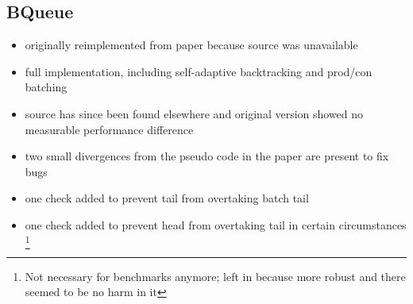 \subsection{BQueue}
\begin{itemize}
    \item originally reimplemented from paper because source was unavailable
    \item full implementation, including self-adaptive backtracking and prod/con batching
    \item source has since been found elsewhere and original version showed no measurable performance difference
    \item two small divergences from the pseudo code in the paper are present to fix bugs
    \item one check added to prevent tail from overtaking batch tail
    \item one check added to prevent head from overtaking tail in certain circumstances
        \footnote{Not necessary for benchmarks anymore; left in because more robust and there seemed to be no
        harm in it}
\end{itemize}

